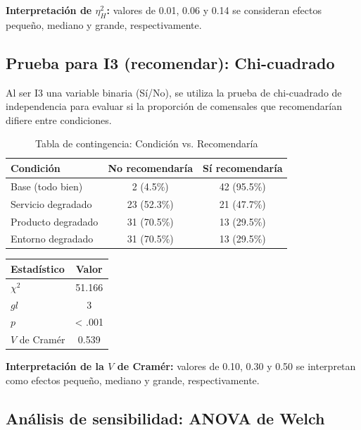 \documentclass[
  spanish,
]{article}
\begin{document}
\textbf{Interpretación de \(\eta^2_H\):} valores de 0.01, 0.06 y 0.14 se
consideran efectos pequeño, mediano y grande, respectivamente.

\subsection{Prueba para I3 (recomendar):
Chi-cuadrado}\label{prueba-para-i3-recomendar-chi-cuadrado}

Al ser I3 una variable binaria (Sí/No), se utiliza la prueba de
chi-cuadrado de independencia para evaluar si la proporción de
comensales que recomendarían difiere entre condiciones.

\begin{table}[!h]
\centering
\caption{\label{tab:chi-tabla-print}Tabla de contingencia: Condición vs. Recomendaría}
\centering
\begin{tabular}[t]{lcc}
\toprule
Condición & No recomendaría & Sí recomendaría\\
\midrule
Base (todo bien) & 2 (4.5\%) & 42 (95.5\%)\\
Servicio degradado & 23 (52.3\%) & 21 (47.7\%)\\
Producto degradado & 31 (70.5\%) & 13 (29.5\%)\\
Entorno degradado & 31 (70.5\%) & 13 (29.5\%)\\
\bottomrule
\end{tabular}
\end{table}

\begin{table}[!h]
\centering
\begin{tabular}{lc}
\toprule
Estadístico & Valor\\
\midrule
$\chi^2$ & 51.166\\
$gl$ & 3\\
$p$ & < .001\\
$V$ de Cramér & 0.539\\
\bottomrule
\end{tabular}
\end{table}

\textbf{Interpretación de la \(V\) de Cramér:} valores de 0.10, 0.30 y
0.50 se interpretan como efectos pequeño, mediano y grande,
respectivamente.

\subsection{Análisis de sensibilidad: ANOVA de
Welch}\label{anuxe1lisis-de-sensibilidad-anova-de-welch}
\end{document}
